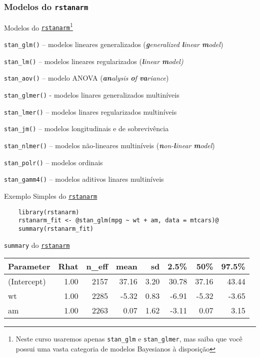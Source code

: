 \subsubsection{Modelos do \texttt{rstanarm}}
\begin{frame}{Modelos do \href{http://mc-stan.org/rstanarm/}{\texttt{rstanarm}}\footnote{Neste curso usaremos apenas \texttt{stan\_glm} e \texttt{stan\_glmer}, mas saiba que você possui uma vasta categoria de modelos Bayesianos à disposição}}
	\begin{vfilleditems}
		\item \texttt{stan\_glm()} -- modelos lineares generalizados (\textit{\textbf{g}eneralized \textbf{l}inear \textbf{m}odel})
		\item \texttt{stan\_lm()} -- modelos lineares regularizados (\textit{\textbf{l}inear \textbf{m}odel)}
		\item \texttt{stan\_aov()} -- modelo ANOVA (\textit{\textbf{an}alysis \textbf{o}f \textbf{va}riance})
		\item \texttt{stan\_glmer()} - modelos linares generalizados multiníveis
		\item \texttt{stan\_lmer()} -- modelos linares regularizados multiníveis
		\item \texttt{stan\_jm()} -- modelos longitudinais e de sobrevivência
		\item \texttt{stan\_nlmer()} -- modelos não-lineares multiníveis (\textit{\textbf{n}on-\textbf{l}inear \textbf{m}odel})
		\item \texttt{stan\_polr()} -- modelos ordinais
		\item \texttt{stan\_gamm4()} -- modelos aditivos linares multiníveis
	\end{vfilleditems}
\end{frame}

\begin{frame}[fragile]{Exemplo Simples do \href{http://mc-stan.org/rstanarm/}{\texttt{rstanarm}}}
	\begin{lstlisting}
    library(rstanarm)
    rstanarm_fit <- @stan_glm(mpg ~ wt + am, data = mtcars)@
    summary(rstanarm_fit)
    \end{lstlisting}
\end{frame}

\begin{frame}{\texttt{summary} do \href{http://mc-stan.org/rstanarm/}{\texttt{rstanarm}}}
	\centering
	\begin{tabular}{lrrrrrrr}
		\toprule
		Parameter   & Rhat & n\_eff & mean  & sd   & 2.5\% & 50\%  & 97.5\% \\
		\midrule
		(Intercept) & 1.00 & 2157   & 37.16 & 3.20 & 30.78 & 37.16 & 43.44  \\
		wt          & 1.00 & 2285   & -5.32 & 0.83 & -6.91 & -5.32 & -3.65  \\
		am          & 1.00 & 2263   & 0.07  & 1.62 & -3.11 & 0.07  & 3.15   \\
		\bottomrule
	\end{tabular}
\end{frame}

